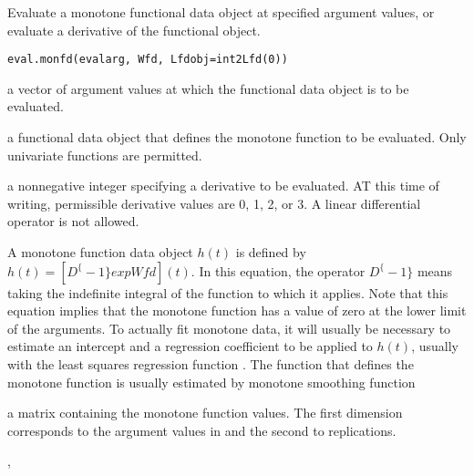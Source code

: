 \begin{Description}\relax
Evaluate a monotone functional data object at specified argument values,
or evaluate a derivative of the functional object.
\end{Description}
\begin{Usage}
\begin{verbatim}
eval.monfd(evalarg, Wfd, Lfdobj=int2Lfd(0))
\end{verbatim}
\end{Usage}
\begin{Arguments}
\begin{ldescription}
\item[\code{evalarg}] a vector of argument values at which the functional data object is to be
evaluated.

\item[\code{Wfd}] a functional data object that defines the monotone function to be
evaluated.  Only univariate functions are permitted.

\item[\code{Lfdobj}] a nonnegative integer specifying a derivative to be evaluated.  AT
this time of writing, permissible derivative values are 0, 1, 2, or 3.
A linear differential operator is not allowed.

\end{ldescription}
\end{Arguments}
\begin{Details}\relax
A monotone function data object $h(t)$ is defined by 
$h(t) = [D^\{-1\} exp Wfd](t)$.  In this equation, the operator  $D^\{-1\}$ means
taking the indefinite integral of the function to which it applies.
Note that this equation implies that the monotone function has a value
of zero at the lower limit of the arguments.  To actually fit monotone
data, it will usually be necessary to estimate an intercept and a
regression coefficient to be applied to $h(t)$, usually with the
least squares regression function .
The function  that defines the monotone function is
usually estimated by monotone smoothing function
\end{Details}
\begin{Value}
a matrix containing the monotone function
values.  The first dimension corresponds to the argument values in
 and
the second to replications.
\end{Value}
\begin{SeeAlso}\relax
{}, 
\end{SeeAlso}
